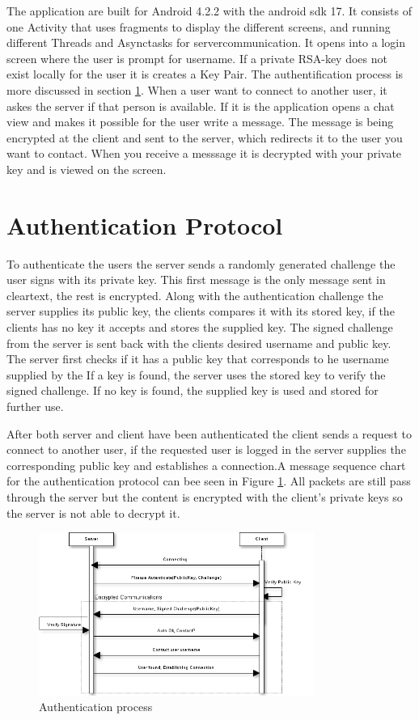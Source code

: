 \documentclass[twocolumn,11pt]{IEEEtran}
\begin{document}
The application are built for Android 4.2.2 with the android sdk 17. It consists of one Activity that uses fragments to display the different screens, and running different Threads and Asynctasks for servercommunication. It opens into a login screen where the user is prompt for username. If a private RSA-key does not exist locally for the user it is creates a Key Pair. The authentification process is more discussed in section \ref{sec:auth}. When a user want to connect to another user, it askes the server if that person is available. If it is the application opens a chat view and makes it possible for the user write a message. The message is being encrypted at the client and sent to the server, which redirects it to the user you want to contact. When you receive a messsage it is decrypted with your private key and is viewed on the screen.



\section{Authentication Protocol}
\label{sec:auth}
To authenticate the users the server sends a randomly generated challenge the user signs with its private key. This first message is the only message sent in cleartext, the rest is encrypted. Along with the authentication challenge the server supplies its public key, the clients compares it with its stored key, if the clients has no key it accepts and stores the supplied key. The signed challenge from the server is sent back with the clients desired username and public key. The server first checks if it has a public key that corresponds to he username supplied by the  If a key is found, the server uses the stored key to verify the signed challenge. If no key is found, the supplied key is used and stored for further use.

After both server and client have been authenticated the client sends a request to connect to another user, if the requested user is logged in the server supplies the corresponding public key and establishes a connection.A message sequence chart for the authentication protocol can bee seen in Figure \ref{fig:auth}. All packets are still pass through the server but the content is encrypted with the client's private keys so the server is not able to decrypt it.


\begin{figure}
\label{fig:auth}
\centerline{
\includegraphics[width=90mm]{auth.png}}
\caption{Authentication process}
\end{figure}
\end{document}

